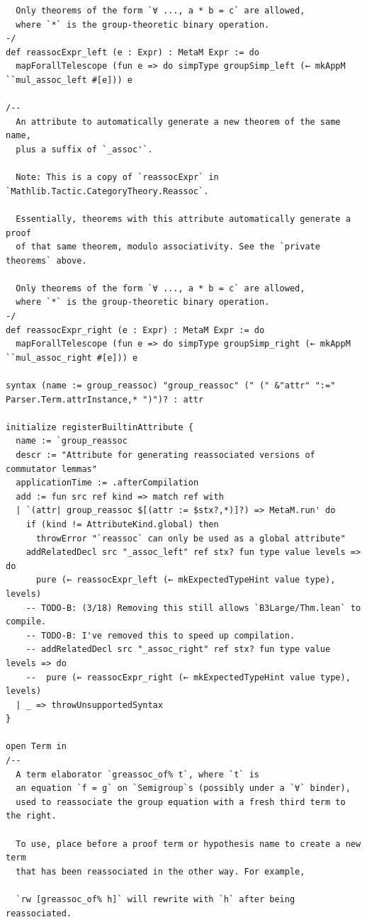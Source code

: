 \documentclass[10pt,a4paper]{article}
\begin{document}
\begin{Verbatim}
  Only theorems of the form `∀ ..., a * b = c` are allowed,
  where `*` is the group-theoretic binary operation.
-/
def reassocExpr_left (e : Expr) : MetaM Expr := do
  mapForallTelescope (fun e => do simpType groupSimp_left (← mkAppM ``mul_assoc_left #[e])) e

/--
  An attribute to automatically generate a new theorem of the same name,
  plus a suffix of `_assoc'`.

  Note: This is a copy of `reassocExpr` in `Mathlib.Tactic.CategoryTheory.Reassoc`.

  Essentially, theorems with this attribute automatically generate a proof
  of that same theorem, modulo associativity. See the `private theorems` above.

  Only theorems of the form `∀ ..., a * b = c` are allowed,
  where `*` is the group-theoretic binary operation.
-/
def reassocExpr_right (e : Expr) : MetaM Expr := do
  mapForallTelescope (fun e => do simpType groupSimp_right (← mkAppM ``mul_assoc_right #[e])) e

syntax (name := group_reassoc) "group_reassoc" (" (" &"attr" ":=" Parser.Term.attrInstance,* ")")? : attr

initialize registerBuiltinAttribute {
  name := `group_reassoc
  descr := "Attribute for generating reassociated versions of commutator lemmas"
  applicationTime := .afterCompilation
  add := fun src ref kind => match ref with
  | `(attr| group_reassoc $[(attr := $stx?,*)]?) => MetaM.run' do
    if (kind != AttributeKind.global) then
      throwError "`reassoc` can only be used as a global attribute"
    addRelatedDecl src "_assoc_left" ref stx? fun type value levels => do
      pure (← reassocExpr_left (← mkExpectedTypeHint value type), levels)
    -- TODO-B: (3/18) Removing this still allows `B3Large/Thm.lean` to compile.
    -- TODO-B: I've removed this to speed up compilation.
    -- addRelatedDecl src "_assoc_right" ref stx? fun type value levels => do
    --  pure (← reassocExpr_right (← mkExpectedTypeHint value type), levels)
  | _ => throwUnsupportedSyntax
}

open Term in
/--
  A term elaborator `greassoc_of% t`, where `t` is
  an equation `f = g` on `Semigroup`s (possibly under a `∀` binder),
  used to reassociate the group equation with a fresh third term to the right.

  To use, place before a proof term or hypothesis name to create a new term
  that has been reassociated in the other way. For example,

  `rw [greassoc_of% h]` will rewrite with `h` after being reassociated.


\end{Verbatim}
\end{document}
